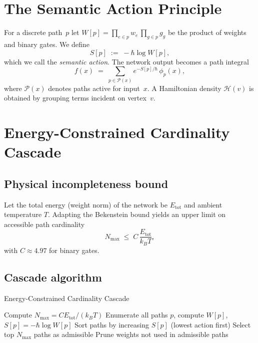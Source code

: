 \documentclass[11pt]{article}
\newcommand{\calP}{\mathcal{P}}
\begin{document}
\section{The Semantic Action Principle}
For a discrete path~$p$ let $W[p]=\prod_{e\in p} w_e\,\prod_{g\in p} g_g$ be the product of weights and binary gates.  We define
\begin{equation}
  S[p] \;:=\; -\hbar \log W[p],
\end{equation}
which we call the \emph{semantic action}.  The network output becomes a path integral
\begin{equation}
  f(x) \;=\; \sum_{p\in\calP(x)} e^{-S[p]/\hbar}\,\phi_p(x),
\end{equation}
where $\calP(x)$ denotes paths active for input~$x$.  A Hamiltonian density $\mathcal{H}(v)$ is obtained by grouping terms incident on vertex~$v$.

\section{Energy-Constrained Cardinality Cascade}
\subsection{Physical incompleteness bound}
Let the total energy (weight norm) of the network be $E_{\text{tot}}$ and ambient temperature $T$.  Adapting the Bekenstein bound yields an upper limit on accessible path cardinality
\begin{equation}
  N_{\max} \;\le\; C\,\frac{E_{\text{tot}}}{k_B T},
\end{equation}
with $C\approx\num{4.97}$ for binary gates.

\subsection{Cascade algorithm}
\begin{algorithm}[h]
  \caption{Energy-Constrained Cardinality Cascade}
  \label{alg:cascade}
  \begin{algorithmic}[1]
    \State Compute $N_{\max}=C E_{\text{tot}}/(k_B T)$
    \State Enumerate all paths $p$, compute $W[p]$, $S[p] = - \hbar \log W[p]$
    \State Sort paths by increasing $S[p]$ (lowest action first)
    \State Select top $N_{\max}$ paths as admissible
    \State Prune weights not used in admissible paths
  \end{algorithmic}
\end{algorithm}
\end{document}

